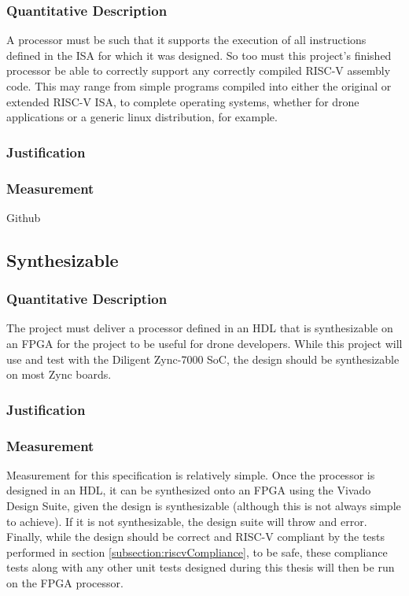 \documentclass[11pt, oneside]{article}      %
\begin{document}
\subsubsection{Quantitative Description}
A processor must be such that it supports the execution of all instructions defined in the \ac{ISA} for which it was designed. So too must this project's finished processor be able to correctly support any correctly compiled RISC-V assembly code. This may range from simple programs compiled into either the original or extended RISC-V \ac{ISA}, to complete operating systems, whether for drone applications or a generic linux distribution, for example. 
\subsubsection{Justification}

\subsubsection{Measurement}
Github\cite{Compliance} 

\subsection{Synthesizable}
\subsubsection{Quantitative Description}
The project must deliver a processor defined in an \ac{HDL} that is synthesizable on an FPGA for the project to be useful for drone developers. While this project will use and test with the Diligent Zync-7000 \ac{SoC}\cite{Zync}, the design should be synthesizable on most Zync boards.
\subsubsection{Justification}
\subsubsection{Measurement}
Measurement for this specification is relatively simple. Once the processor is designed in an \ac{HDL}, it can be synthesized onto an FPGA using the Vivado Design Suite, given the design is synthesizable (although this is not always simple to achieve). If it is not synthesizable, the design suite will throw and error.
Finally, while the design should be correct and RISC-V compliant by the tests performed in section \ref{subsection:riscvCompliance}, to be safe, these compliance tests along with any other unit tests designed during this thesis will then be run on the \ac{FPGA} processor.
\end{document}
